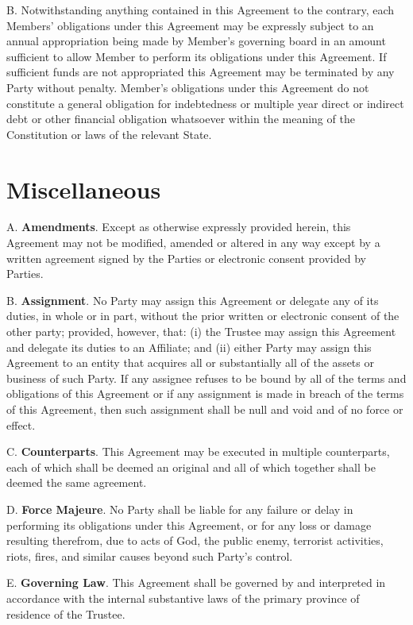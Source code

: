 \documentclass[]{book}
\begin{document}
B. Notwithstanding anything contained in this Agreement to the contrary, each Members' obligations under this Agreement may be expressly subject to an annual appropriation being made by Member's governing board in an amount sufficient to allow Member to perform its obligations under this Agreement. If sufficient funds are not appropriated this Agreement may be terminated by any Party without penalty. Member's obligations under this Agreement do not constitute a general obligation for indebtedness or multiple year direct or indirect debt or other financial obligation whatsoever within the meaning of the Constitution or laws of the relevant State.

\hypertarget{miscellaneous}{%
\chapter{Miscellaneous}\label{miscellaneous}}

A. \textbf{Amendments}. Except as otherwise expressly provided herein, this Agreement may not be modified, amended or altered in any way except by a written agreement signed by the Parties or electronic consent provided by Parties.

B. \textbf{Assignment}. No Party may assign this Agreement or delegate any of its duties, in whole or in part, without the prior written or electronic consent of the other party; provided, however, that: (i) the Trustee may assign this Agreement and delegate its duties to an Affiliate; and (ii) either Party may assign this Agreement to an entity that acquires all or substantially all of the assets or business of such Party. If any assignee refuses to be bound by all of the terms and obligations of this Agreement or if any assignment is made in breach of the terms of this Agreement, then such assignment shall be null and void and of no force or effect.

C. \textbf{Counterparts}. This Agreement may be executed in multiple counterparts, each of which shall be deemed an original and all of which together shall be deemed the same agreement.

D. \textbf{Force Majeure}. No Party shall be liable for any failure or delay in performing its obligations under this Agreement, or for any loss or damage resulting therefrom, due to acts of God, the public enemy, terrorist activities, riots, fires, and similar causes beyond such Party's control.

E. \textbf{Governing Law}. This Agreement shall be governed by and interpreted in accordance with the internal substantive laws of the primary province of residence of the Trustee.
\end{document}
